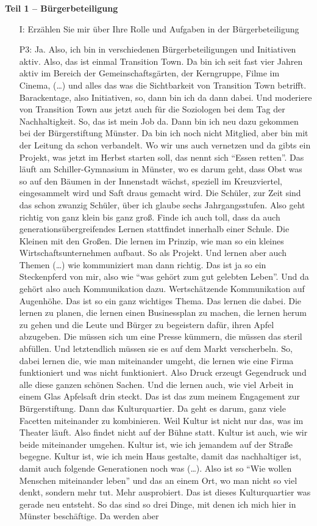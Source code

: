 \textbf{Teil 1 -- B{\"u}rgerbeteiligung}
\begin{itemize}
    \item[I:] Erz{\"a}hlen Sie mir {\"u}ber Ihre Rolle und Aufgaben in der B{\"u}rgerbeteiligung
    \item[P3:] Ja. Also, ich bin in verschiedenen B{\"u}rgerbeteiligungen und Initiativen aktiv. Also, das ist einmal Transition Town. Da bin ich seit fast vier Jahren aktiv im Bereich der Gemeinschaftsg{\"a}rten, der Kerngruppe, Filme im Cinema, (\dots) und alles das was die Sichtbarkeit von Transition Town betrifft. Barackentage, also Initiativen, so, dann bin ich da dann dabei. Und moderiere von Transition Town aus jetzt auch f{\"u}r die Soziologen bei dem Tag der Nachhaltigkeit. So, das ist mein Job da. Dann bin ich neu dazu gekommen bei der B{\"u}rgerstiftung M{\"u}nster. Da bin ich noch nicht Mitglied, aber bin mit der Leitung da schon verbandelt. Wo wir uns auch vernetzen und da gibts ein Projekt, was jetzt im Herbst starten soll, das nennt sich "`Essen retten"'. Das l{\"a}uft am Schiller-Gymnasium in M{\"u}nster, wo es darum geht, dass Obst was so auf den B{\"a}umen in der Innenstadt w{\"a}chst, speziell im Kreuzviertel, eingesammelt wird und Saft draus gemacht wird. Die Sch{\"u}ler, zur Zeit sind das schon zwanzig Sch{\"u}ler, {\"u}ber ich glaube sechs Jahrgangsstufen. Also geht richtig von ganz klein bis ganz gro{\ss}. Finde ich auch toll, dass da auch generations{\"u}bergreifendes Lernen stattfindet innerhalb einer Schule. Die Kleinen mit den Gro{\ss}en. Die lernen im Prinzip, wie man so ein kleines Wirtschaftsunternehmen aufbaut. So als Projekt. Und lernen aber auch Themen (\dots) wie kommuniziert man dann richtig. Das ist ja so ein Steckenpferd von mir, also wie "`was geh{\"o}rt zum gut gelebten Leben"'. Und da geh{\"o}rt also auch Kommunikation dazu. Wertsch{\"a}tzende Kommunikation auf Augenh{\"o}he. Das ist so ein ganz wichtiges Thema. Das lernen die dabei. Die lernen zu planen, die lernen einen Businessplan zu machen, die lernen herum zu gehen und die Leute und B{\"u}rger zu begeistern daf{\"u}r, ihren Apfel abzugeben. Die m{\"u}ssen sich um eine Presse k{\"u}mmern, die m{\"u}ssen das steril abf{\"u}llen. Und letztendlich m{\"u}ssen sie es auf dem Markt verscherbeln. So, dabei lernen die, wie man miteinander umgeht, die lernen wie eine Firma funktioniert und was nicht funktioniert. Also Druck erzeugt Gegendruck und alle diese ganzen sch{\"o}nen Sachen. Und die lernen auch, wie viel Arbeit in einem Glas Apfelsaft drin steckt. Das ist das zum meinem Engagement zur B{\"u}rgerstiftung. Dann das Kulturquartier. Da geht es darum, ganz viele Facetten miteinander zu kombinieren. Weil Kultur ist nicht nur das, was im Theater l{\"a}uft. Also findet nicht auf der B{\"u}hne statt. Kultur ist auch, wie wir beide miteinander umgehen. Kultur ist, wie ich jemandem auf der Stra{\ss}e begegne. Kultur ist, wie ich mein Haus gestalte, damit das nachhaltiger ist, damit auch folgende Generationen noch was (\dots). Also ist so "`Wie wollen Menschen miteinander leben"' und das an einem Ort, wo man nicht so viel denkt, sondern mehr tut. Mehr ausprobiert. Das ist dieses Kulturquartier was gerade neu entsteht. So das sind so drei Dinge, mit denen ich mich hier in M{\"u}nster besch{\"a}ftige. Da werden aber 
\end{itemize}
